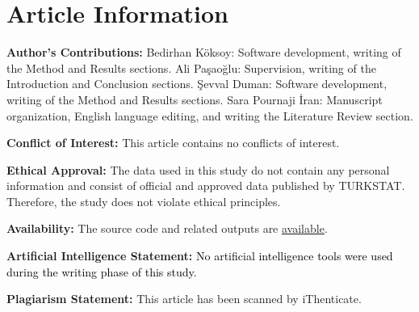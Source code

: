 \documentclass[final, 9pt, twocolumn]{saucis}
\newcommand{\rev}[1]{\textcolor{black}{#1}}
\begin{document}
\section*{Article Information}
\vspace{0.2cm}

\textbf{Author's Contributions:}
Bedirhan Köksoy: Software development, writing of the Method and Results sections. Ali Paşaoğlu: Supervision, writing of the Introduction and Conclusion sections. Şevval Duman: Software development, writing of the Method and Results sections. Sara Pournaji İran: Manuscript organization, English language editing, and writing the Literature Review section.\vspace{0.2cm}

\textbf{Conflict of Interest:}
This article contains no conflicts of interest.\vspace{0.2cm}

\textbf{Ethical Approval:}
The data used in this study do not contain any personal information and consist of official and approved data published by TURKSTAT. Therefore, the study does not violate ethical principles.
\vspace{0.2cm}

\textbf{Availability:}
The source code and related outputs are \href{https://github.com/koksoybedirhan/Forecasting-Provincial-Healthcare-Infrastructure}{available}.\vspace{0.2cm}

\textbf{Artificial Intelligence Statement:}
\rev{No artificial intelligence tools were used during the writing phase of this study.}
\vspace{0.2cm}

\textbf{Plagiarism Statement:}
This article has been scanned by iThenticate\texttrademark.
\vspace{0.2cm}
\end{document}
